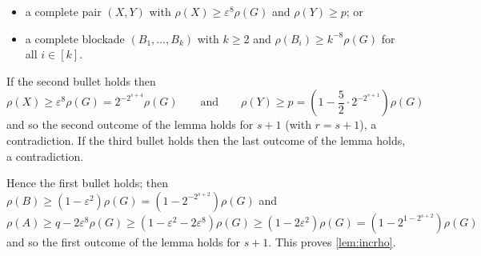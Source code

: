 \documentclass[11pt,reqno]{amsart}
\let\oldendproof\endproof
\renewenvironment{proof}[1][\proofname]{%
	\oldproof[\normalfont\bfseries #1]%
}{\oldendproof}
\newcommand{\eps}{\varepsilon}
\begin{document}
\begin{proof}
\begin{itemize}
			\item a complete pair $(X,Y)$ with $\rho(X)\ge \eps^8\rho(G)$ and $\rho(Y)\ge p$; or
			
			\item a complete blockade $(B_1,\ldots,B_k)$ with $k\ge2$ and $\rho(B_i)\ge k^{-8}\rho(G)$ for all $i\in[k]$.
		\end{itemize}
		
		If the second bullet holds then \[\rho(X)\ge\eps^8\rho(G)=2^{-2^{s+4}}\rho(G)
		\qquad\text{and}\qquad
		\rho(Y)\ge p=\left(1-\frac52\cdot 2^{-2^{s+1}}\right)\rho(G)\]
		and so the second outcome of the lemma holds for $s+1$ (with $r=s+1$), a contradiction.
		If the third bullet holds then the last outcome of the lemma holds, a contradiction.
		
		Hence the first bullet holds; then $\rho(B)\ge(1-\eps^2)\rho(G)=(1-2^{-2^{s+2}})\rho(G)$ and
		\[\rho(A)\ge q-2\eps^8\rho(G)\ge (1-\eps^2-2\eps^8)\rho(G)\ge(1-2\eps^2)\rho(G)
		=(1-2^{1-2^{s+2}})\rho(G)\]
		and so the first outcome of the lemma holds for $s+1$. This proves \cref{lem:incrho}.
	\end{proof}
	
\end{document}
